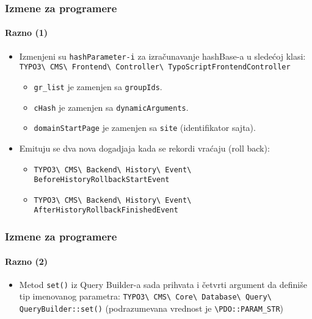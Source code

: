 \begin{frame}[fragile]
	\frametitle{Izmene za programere}
	\framesubtitle{Razno (1)}

	\begin{itemize}
		\item Izmenjeni su \texttt{hashParameter-i} za izračunavanje hashBase-a u sledećoj klasi:\newline
			\small
				\texttt{TYPO3\textbackslash
					CMS\textbackslash
					Frontend\textbackslash
					Controller\textbackslash
					TypoScriptFrontendController}
			\normalsize

			\begin{itemize}
				\item \texttt{gr\_list} je zamenjen sa \texttt{groupIds}.
				\item \texttt{cHash} je zamenjen sa \texttt{dynamicArguments}.
				\item \texttt{domainStartPage} je zamenjen sa \texttt{site} (identifikator sajta).
			\end{itemize}

		\item Emituju se dva nova dogadjaja kada se rekordi vraćaju (roll back):

			\begin{itemize}\smaller
				\item \texttt{TYPO3\textbackslash
					CMS\textbackslash
					Backend\textbackslash
					History\textbackslash
					Event\textbackslash
					BeforeHistoryRollbackStartEvent}
				\item \texttt{TYPO3\textbackslash
					CMS\textbackslash
					Backend\textbackslash
					History\textbackslash
					Event\textbackslash
					AfterHistoryRollbackFinishedEvent}
			\end{itemize}\normalsize

	\end{itemize}

\end{frame}


\begin{frame}[fragile]
	\frametitle{Izmene za programere}
	\framesubtitle{Razno (2)}

	\begin{itemize}
		\item Metod \texttt{set()} iz Query Builder-a sada prihvata i četvrti argument
		 	da definiše tip imenovanog parametra:\newline
			\small
				\texttt{TYPO3\textbackslash
					CMS\textbackslash
					Core\textbackslash
					Database\textbackslash
					Query\textbackslash
					QueryBuilder::set()}
			\normalsize\newline
			\vspace{0.2cm}
			(podrazumevana vrednost je \texttt{\textbackslash PDO::PARAM\_STR})

	\end{itemize}

\end{frame}

